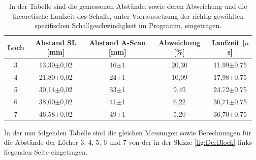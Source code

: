 \documentclass[titlepage = firstcover]{scrartcl}
\begin{document}
            \begin{table}[h]
                \centering
                \caption{In der Tabelle sind die gemessenen Abstände, sowie deren Abweichung und die theoretische Laufzeit des Schalls, unter Vorraussetzung der richtig gewählten spezifischen Schallgeschwindigkeit im Programm, eingetragen.}
                \label{tab:Abstand1}

                \begin{tabular}{c c c c c}
                    \toprule
                    {Loch} & {Abstand SL [mm]} & {Abstand A-Scan [mm]} & {Abweichung [\%]} & {Laufzeit [$\mu$s]}  \\
                    \midrule
                    3   &   13,30$\pm$0,02   &   16$\pm$1  &   20,30   &   11.99$\pm$0,75   \\
                    4   &   21,80$\pm$0,02   &   24$\pm$1  &   10,09   &   17,98$\pm$0,75   \\
                    5   &   30,14$\pm$0,02   &   33$\pm$1  &   9,49    &   24,72$\pm$0,75   \\
                    6   &   38,60$\pm$0,02   &   41$\pm$1  &   6,22    &   30,71$\pm$0,75   \\
                    7   &   46,58$\pm$0,02   &   49$\pm$1  &   5,20    &   36,70$\pm$0,75   \\       
                    \bottomrule
                \end{tabular}

            \end{table}

            \FloatBarrier
            \noindent
            In der nun folgenden Tabelle sind die gleichen Messungen sowie Berechnungen für die Abstände der Löcher 3, 4, 5, 6 und 7 von der in der Skizze \ref{fig:DerBlock} links liegenden Seite eingetragen.
            
\end{document}
